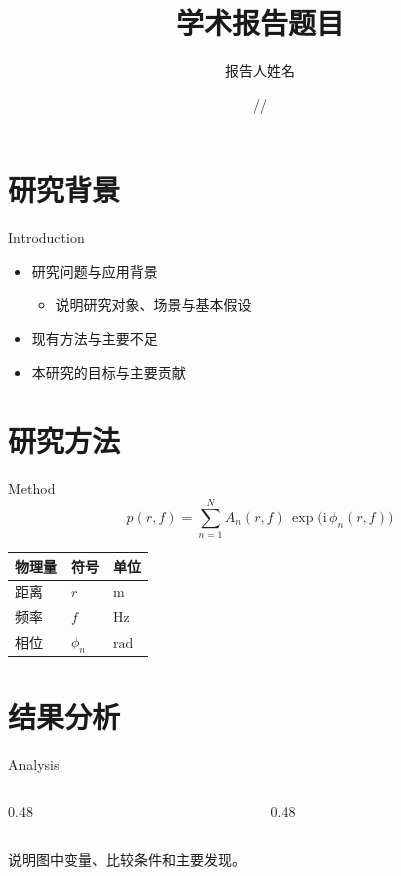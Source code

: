 \documentclass[aspectratio=43,11pt,t]{beamer}
\title{学术报告题目}
\author{报告人姓名}
\institute{中山大学\quad 海洋工程与技术学院}
\date{\number\year/\number\month/\number\day}
\begin{document}
\SYSUtitleframe
\SYSUoutlineframe

\section{研究背景}
\begin{frame}{Introduction}
  \begin{itemize}
    \item 研究问题与应用背景
      \begin{itemize}
        \item 说明研究对象、场景与基本假设
      \end{itemize}
    \item 现有方法与主要不足
    \item 本研究的目标与主要贡献
  \end{itemize}
\end{frame}

\section{研究方法}
\begin{frame}{Method}
  \[
    p(r,f)=\sum_{n=1}^{N} A_n(r,f)\,
      \exp\bigl(\mathrm{i}\,\phi_n(r,f)\bigr)
  \]
  \vspace{1mm}
  \begin{center}
    \begin{tabular}{lll}
      \toprule
      物理量 & 符号 & 单位 \\
      \midrule
      距离 & \(r\) & \(\mathrm{m}\) \\
      频率 & \(f\) & \(\mathrm{Hz}\) \\
      相位 & \(\phi_n\) & \(\mathrm{rad}\) \\
      \bottomrule
    \end{tabular}
  \end{center}
\end{frame}

\section{结果分析}
\begin{frame}{Analysis}
  \begin{columns}[T,onlytextwidth]
    \begin{column}{0.48\textwidth}
    \end{column}
    \begin{column}{0.48\textwidth}
    \end{column}
  \end{columns}
  \vspace{4mm}
  说明图中变量、比较条件和主要发现。
\end{frame}
\end{document}
